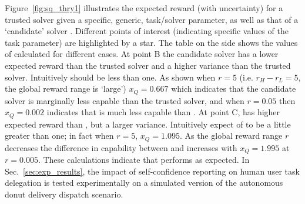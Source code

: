 %
%
Figure~\ref{fig:sq_thry1} illustrates the expected reward (with uncertainty) for a trusted solver \solvetrust{} given a specific, generic, task/solver parameter, as well as that of a `candidate' solver \solve. Different points of interest (indicating specific values of the task parameter) are highlighted by a star. The table on the side shows the values of \xQ{} calculated for different cases. At point B the candidate solver has a lower expected reward than the trusted solver and a higher variance than the trusted solver. Intuitively \xQ{} should be less than one. As shown when $r=5$ (i.e. $r_H-r_L=5$, the global reward range is `large') $x_Q=0.667$ which indicates that the candidate solver is marginally less capable than the trusted solver, and when $r=0.05$ then $x_Q=0.002$ indicates that \solve{} is much less capable than \solvetrust. At point C, \solve{} has higher expected reward than \solvetrust, but a larger variance. Intuitively expect \xQ{} of \solve{} to be a little greater than one; in fact when $r=5$, $x_Q=1.095$. As the global reward range $r$ decreases the difference in capability between \solve{} and \solvetrust{} increases with $x_Q=1.995$ at $r=0.005$. These calculations indicate that \xQ{} performs as expected. In Sec.~\ref{sec:exp_results}, the impact of self-confidence reporting on human user task delegation is tested experimentally on a simulated version of the autonomous donut delivery dispatch scenario. 

